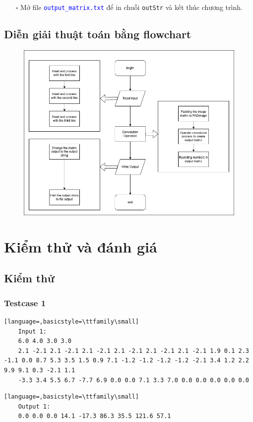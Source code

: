 \documentclass{article}
\begin{document}
\begin{itemize}
	\item [$\square$] Mở file \texttt{\textcolor{blue}{output\_matrix.txt}} để in chuỗi \texttt{outStr} và kết thúc chương trình.
\end{itemize}

\subsection{Diễn giải thuật toán bằng flowchart}
\begin{figure}[ht]
	\centering
	\includegraphics[scale=0.5]{FlowChartForConvolutionOperator.png}
\end{figure}
\pagebreak
\section*{Kiểm thử và đánh giá}
\setcounter{section}{1}\setlength{\baselineskip}{15pt}
\setcounter{subsection}{0}
\setcounter{subsubsection}{0}
\large
\subsection{Kiểm thử}
\subsubsection{Testcase 1}
\begin{lstlisting}[language=,basicstyle=\ttfamily\small]
	Input 1:
	6.0 4.0 3.0 3.0
	2.1 -2.1 2.1 -2.1 2.1 -2.1 2.1 -2.1 2.1 -2.1 2.1 -2.1 1.9 0.1 2.3 -1.1 0.0 8.7 5.3 3.5 1.5 0.9 7.1 -1.2 -1.2 -1.2 -1.2 -2.1 3.4 1.2 2.2 9.9 9.1 0.3 -2.1 1.1
	-3.3 3.4 5.5 6.7 -7.7 6.9 0.0 0.0 7.1 3.3 7.0 0.0 0.0 0.0 0.0 0.0
\end{lstlisting}
\begin{lstlisting}[language=,basicstyle=\ttfamily\small]
	Output 1:
	0.0 0.0 0.0 14.1 -17.3 86.3 35.5 121.6 57.1
\end{lstlisting}
\end{document}
